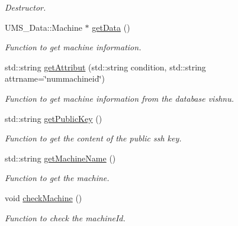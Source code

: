 \begin{DoxyCompactItemize}
\begin{DoxyCompactList}\small\item\em Destructor. \item\end{DoxyCompactList}\item 
UMS\_\-Data::Machine $\ast$ \hyperlink{classMachineServer_a525e619128a0472920cf9894184f5b45}{getData} ()
\begin{DoxyCompactList}\small\item\em Function to get machine information. \item\end{DoxyCompactList}\item 
std::string \hyperlink{classMachineServer_a14afc6c4424dd26be8cc0843aac3f2f3}{getAttribut} (std::string condition, std::string attrname=\char`\"{}nummachineid\char`\"{})
\begin{DoxyCompactList}\small\item\em Function to get machine information from the database vishnu. \item\end{DoxyCompactList}\item 
std::string \hyperlink{classMachineServer_a75c136bdf1d210f19b5794f7c7ccd948}{getPublicKey} ()
\begin{DoxyCompactList}\small\item\em Function to get the content of the public ssh key. \item\end{DoxyCompactList}\item 
std::string \hyperlink{classMachineServer_a8ae5d6597c53a2507d2f1e63f8b30865}{getMachineName} ()
\begin{DoxyCompactList}\small\item\em Function to get the machine. \item\end{DoxyCompactList}\item 
void \hyperlink{classMachineServer_aaf07e7d2fa553c63b75e2b6e9aaf762e}{checkMachine} ()
\begin{DoxyCompactList}\small\item\em Function to check the machineId. \item\end{DoxyCompactList}\end{DoxyCompactItemize}
